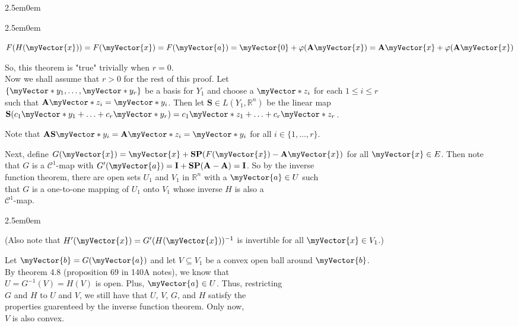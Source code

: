 \documentclass{book}
\newenvironment{myIndent}{%
   \begin{adjustwidth}{2.5em}{0em}%
}{%
   \end{adjustwidth}%
}
\newcommand{\retTwo}{\hfill\bigbreak}
\newcommand{\mVec}[1]{\myVector{#1}}
\newcommand{\mVecAst}[1]{\myVector*{#1}}
\newcommand{\mMat}[1]{\mathbf{#1}}
\begin{document}
{\begin{myIndent}
{\begin{myIndent}
      {\centering $F(H(\mVec{x})) = F(\mVec{x}) = F(\mVec{a}) = \mVec{0} + \varphi(\mMat{A}\mVec{x}) = \mMat{A}\mVec{x} + \varphi(\mMat{A}\mVec{x})$ \retTwo\par}
      
      So, this theorem is "true" trivially when $r = 0$.\\ [8pt]

      Now we shall assume that $r > 0$ for the rest of this proof. Let\\ $\{\mVecAst{y}_1, \ldots, \mVecAst{y}_r\}$ be a basis for $Y_1$ and choose a $\mVecAst{z}_i$ for each $1 \leq i \leq r$\\ such that $\mMat{A}\mVecAst{z}_i = \mVecAst{y}_i$. Then let $\mMat{S} \in L(Y_1, \mathbb{R}^n)$ be the linear map\\ $\mMat{S}(c_1\mVecAst{y}_1 + \ldots + c_r\mVecAst{y}_r) = c_1\mVecAst{z}_1 + \ldots + c_r\mVecAst{z}_r$.

      \newpage

      Note that $\mMat{AS}\mVecAst{y}_i = \mMat{A}\mVecAst{z}_i = \mVecAst{y}_i$ for all $i \in \{1, \ldots, r\}$.\retTwo

      Next, define $G(\mVec{x}) = \mVec{x} + \mMat{SP}(F(\mVec{x}) - \mMat{A}\mVec{x})$ for all $\mVec{x} \in E$. Then note\\ that $G$ is a $\mathscr{C}^1$-map with $G^\prime(\mVec{a}) = \mMat{I} + \mMat{SP}(\mMat{A} - \mMat{A}) = \mMat{I}$. So by the inverse\\ function theorem, there are open sets $U_1$ and $V_1$ in $\mathbb{R}^n$ with a $\mVec{a} \in U$ such\\ that $G$ is a one-to-one mapping of $U_1$ onto $V_1$ whose inverse $H$ is also a\\ $\mathscr{C}^1$-map.
      
      \begin{myIndent}
         (Also note that $H^\prime(\mVec{x}) = G^\prime(H(\mVec{x}))^{-1}$ is invertible for all $\mVec{x} \in V_1$.)\retTwo
      \end{myIndent}

      Let $\mVec{b} = G(\mVec{a})$ and let $V \subseteq V_1$ be a convex open ball around $\mVec{b}$.\\ By theorem 4.8 (proposition 69 in 140A notes), we know that\\ $U = G^{-1}(V) = H(V)$ is open. Plus, $\mVec{a} \in U$. Thus, restricting\\ $G$ and $H$ to $U$ and $V$, we still have that $U$, $V$, $G$, and $H$ satisfy the\\ properties guarenteed by the inverse function theorem. Only now,\\ $V$ is also convex.\retTwo


\end{myIndent}}
\end{myIndent}}
\end{document}
